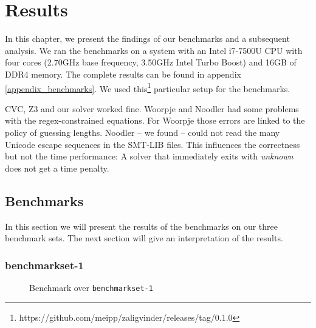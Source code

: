 \chapter{Results} \label{ch_results}
In this chapter, we present the findings of our benchmarks and a subsequent analysis. We ran the benchmarks on a system with an Intel i7-7500U CPU with four cores (2.70GHz base frequency, 3.50GHz Intel Turbo Boost) and 16GB of DDR4 memory. The complete results can be found in appendix \ref{appendix_benchmarks}. We used this\footnote{https://github.com/meipp/zaligvinder/releases/tag/0.1.0} particular setup for the benchmarks.

CVC, Z3 and our solver worked fine. Woorpje and Noodler had some problems with the regex-constrained equations. For Woorpje those errors are linked to the policy of guessing lengths. Noodler -- we found -- could not read the many Unicode escape sequences in the SMT-LIB files. This influences the correctness but not the time performance: A solver that immediately exits with \textit{unknown} does not get a time penalty.

\section{Benchmarks}
In this section we will present the results of the benchmarks on our three benchmark sets. The next section will give an interpretation of the results.

\subsection{benchmarkset-1}

\begin{figure}%
\caption{Benchmark over \texttt{benchmarkset-1}}
\label{fig:benchmark-1}
\end{figure}

